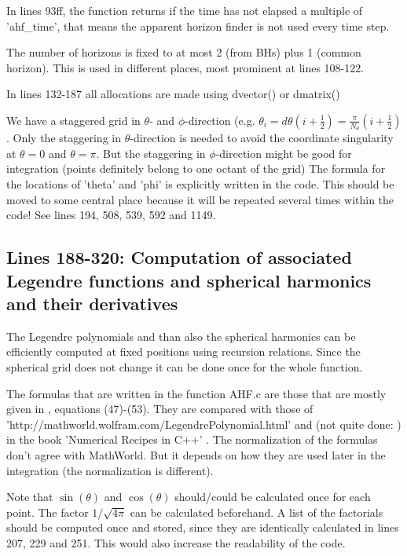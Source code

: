 \documentclass[11pt,a4paper,twoside]{article}
\begin{document}
In lines 93ff, the function returns if the time has not elapsed a multiple
of 'ahf\_time', that means the apparent horizon finder is not used every time step.

The number of horizons is fixed to at most 2 (from BHs) plus 1 (common horizon).
This is used in different places, most prominent at lines 108-122.

In lines 132-187 all allocations are made using dvector() or dmatrix()

We have a staggered grid in $\theta$- and $\phi$-direction 
(e.g. $\theta_i=d\theta(i+\frac 1 2) = \frac \pi {N_{\theta}} (i+\frac 1 2)$. 
Only the staggering in $\theta$-direction is 
needed to avoid the coordinate  singularity at $\theta=0$ and $\theta=\pi$. 
But the staggering in $\phi$-direction might be good for integration
(points definitely belong to one octant of the grid)
The formula for the locations of 'theta' and 'phi' is explicitly 
written in the code. This should be moved to some central place because
it will be repeated several times within the code! 
See lines 194, 508, 539, 592 and 1149.

\subsection{Lines 188-320: Computation of associated Legendre functions and 
    spherical harmonics and their derivatives}
The Legendre polynomials and than also the spherical harmonics can be 
efficiently computed at fixed positions using recursion relations. 
Since the spherical grid does not change it can be done once for the whole 
function.

The formulas that are written in the function AHF.c are those that are
mostly given in \cite{Gundlach:1997us}, equations (47)-(53). 
They are compared with 
those of 'http://math\-world.wolfram.com/\-LegendrePolynomial.html'
and (not quite done: ) in the book 'Numerical Reci\-pes in C++' \cite{Press:2002}.
\warningsymbol The normalization of the formulas don't agree with MathWorld. 
But it depends on
how they are used later in the integration (the normalization is different).

Note that $\sin(\theta)$ and $\cos(\theta)$ should/could be calculated
once for each point. The factor $1/\sqrt{4 \pi}$ can be calculated beforehand.
A list of the factorials should be computed once and stored,
since they are identically calculated in lines 207, 229 and 251. This would
also increase the readability of the code.
\end{document}
